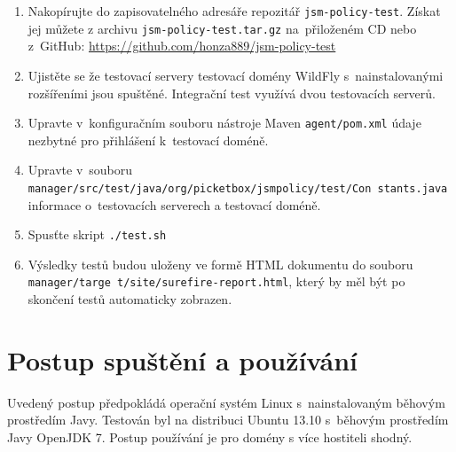 \begin{enumerate}
  \item Nakopírujte do zapisovatelného adresáře repozitář {\tt jsm-policy-test}. Získat jej můžete z archivu {\tt jsm-policy-test.tar.gz} na~přiloženém CD nebo z~GitHub:
    \newline\url{https://github.com/honza889/jsm-policy-test}
  \item Ujistěte se že testovací servery testovací domény WildFly s~nainstalovanými rozšířeními jsou spuštěné. Integrační test využívá dvou testovacích serverů.
  \item Upravte v~konfiguračním souboru nástroje Maven {\tt agent/pom.xml} údaje nezbytné pro přihlášení k~testovací doméně.
  \item Upravte v~souboru {\tt manager/src/test/java/org/picketbox/jsmpolicy/test/Con stants.java} informace o~testovacích serverech a testovací doméně.
  \item Spusťte skript {\tt ./test.sh}
  \item Výsledky testů budou uloženy ve formě HTML dokumentu do souboru {\tt manager/targe t/site/surefire-report.html}, který by měl být po skončení testů automaticky zobrazen.
\end{enumerate}


\chapter{Postup spuštění a používání}\label{prilohaPouzivani}

Uvedený postup předpokládá operační systém Linux s~nainstalovaným běhovým prostředím Javy. Testován byl na distribuci Ubuntu 13.10 s~běhovým prostředím Javy OpenJDK 7. Postup používání je pro domény s více hostiteli shodný.

